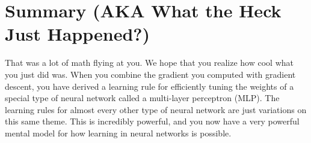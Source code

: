 \documentclass[assignment06_Solutions]{subfiles}
\begin{document}
\section{Summary (AKA What the Heck Just Happened?)}
That was a lot of math flying at you.  We hope that you realize how cool what you just did was.  When you combine the gradient you computed with gradient descent, you have derived a learning rule for efficiently tuning the weights of a special type of neural network called a multi-layer perceptron (MLP).  The learning rules for almost every other type of neural network are just variations on this same theme.  This is incredibly powerful, and you now have a very powerful mental model for how learning in neural networks is possible.
%
%
%
%
%
%
%
%
%
\end{document}
